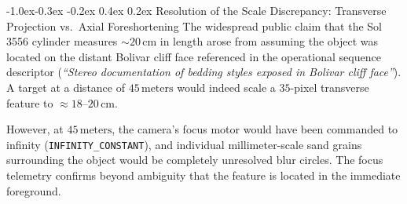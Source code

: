 \documentclass[11pt,a4paper]{article}
\makeatletter
\renewcommand\subsection{\@startsection{subsection}{2}{\z@}%
                                     {-1.0ex\@plus -0.3ex \@minus -0.2ex}%
                                     {0.4ex \@plus 0.2ex}%
                                     {\normalfont\normalsize\bfseries}}
\makeatother
\begin{document}
\subsection{Resolution of the Scale Discrepancy: Transverse Projection vs.\ Axial Foreshortening}
The widespread public claim that the Sol 3556 cylinder measures $\sim 20\,\text{cm}$ in length arose from assuming the object was located on the distant Bolivar cliff face referenced in the operational sequence descriptor (\textit{``Stereo documentation of bedding styles exposed in Bolivar cliff face''}). A target at a distance of $45\,\text{meters}$ would indeed scale a $35$-pixel transverse feature to $\approx 18\text{--}20\,\text{cm}$.

However, at $45\,\text{meters}$, the camera's focus motor would have been commanded to infinity (\texttt{INFINITY\_CONSTANT}), and individual millimeter-scale sand grains surrounding the object would be completely unresolved blur circles. The focus telemetry confirms beyond ambiguity that the feature is located in the immediate foreground.
\end{document}
